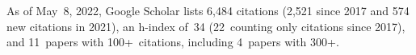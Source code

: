 %
As of May~8, 2022, Google Scholar lists
6,484 citations (2,521 since 2017 and 574 new citations in 2021),
an h-index of~34 (22~counting only citations since 2017),
and 11~papers with 100+~citations, including 4~papers with 300+.
